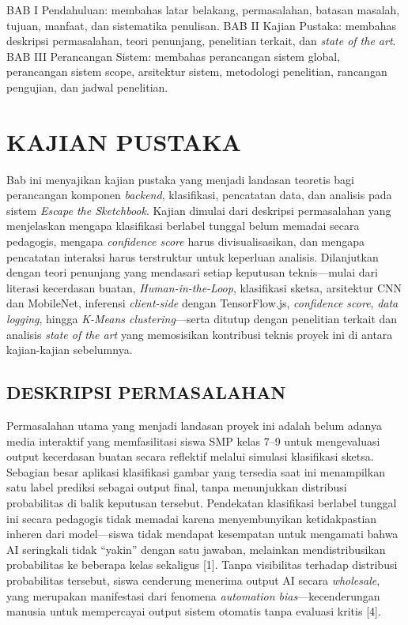 \documentclass[10pt,twoside,openright]{report}
\begin{document}
BAB I Pendahuluan: membahas latar belakang, permasalahan, batasan masalah, tujuan, manfaat, dan sistematika penulisan. BAB II Kajian Pustaka: membahas deskripsi permasalahan, teori penunjang, penelitian terkait, dan \textit{state of the art}. BAB III Perancangan Sistem: membahas perancangan sistem global, perancangan sistem scope, arsitektur sistem, metodologi penelitian, rancangan pengujian, dan jadwal penelitian.


\chapter{KAJIAN PUSTAKA}
\label{chap:bab2}

Bab ini menyajikan kajian pustaka yang menjadi landasan teoretis bagi perancangan komponen \textit{backend}, klasifikasi, pencatatan data, dan analisis pada sistem \textit{Escape the Sketchbook}. Kajian dimulai dari deskripsi permasalahan yang menjelaskan mengapa klasifikasi berlabel tunggal belum memadai secara pedagogis, mengapa \textit{confidence score} harus divisualisasikan, dan mengapa pencatatan interaksi harus terstruktur untuk keperluan analisis. Dilanjutkan dengan teori penunjang yang mendasari setiap keputusan teknis—mulai dari literasi kecerdasan buatan, \textit{Human-in-the-Loop}, klasifikasi sketsa, arsitektur CNN dan MobileNet, inferensi \textit{client-side} dengan TensorFlow.js, \textit{confidence score}, \textit{data logging}, hingga \textit{K-Means clustering}—serta ditutup dengan penelitian terkait dan analisis \textit{state of the art} yang memosisikan kontribusi teknis proyek ini di antara kajian-kajian sebelumnya.

\section{DESKRIPSI PERMASALAHAN}
\label{sec:deskripsi-permasalahan}

Permasalahan utama yang menjadi landasan proyek ini adalah belum adanya media interaktif yang memfasilitasi siswa SMP kelas 7--9 untuk mengevaluasi output kecerdasan buatan secara reflektif melalui simulasi klasifikasi sketsa. Sebagian besar aplikasi klasifikasi gambar yang tersedia saat ini menampilkan satu label prediksi sebagai output final, tanpa menunjukkan distribusi probabilitas di balik keputusan tersebut. Pendekatan klasifikasi berlabel tunggal ini secara pedagogis tidak memadai karena menyembunyikan ketidakpastian inheren dari model—siswa tidak mendapat kesempatan untuk mengamati bahwa AI seringkali tidak ``yakin'' dengan satu jawaban, melainkan mendistribusikan probabilitas ke beberapa kelas sekaligus [1]. Tanpa visibilitas terhadap distribusi probabilitas tersebut, siswa cenderung menerima output AI secara \textit{wholesale}, yang merupakan manifestasi dari fenomena \textit{automation bias}—kecenderungan manusia untuk mempercayai output sistem otomatis tanpa evaluasi kritis [4].
\end{document}
